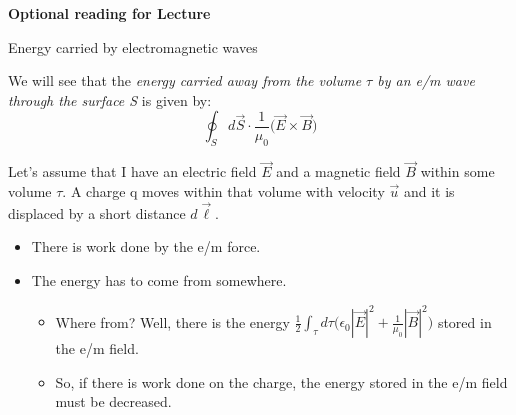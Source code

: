 
\begin{frame}[plain,c]
\begin{center}
{\Huge \bf Optional reading for Lecture \thislecture}
\end{center}
\end{frame}

%
%
%
%

\begin{frame}{Energy carried by electromagnetic waves}

We will see that the  {\em energy carried away from the volume $\tau$ by an e/m wave
through the surface S} is given by:
\begin{equation*}
     \oint_{S} d\vec{S} \cdot \frac{1}{\mu_0} \Big( \vec{E} \times \vec{B} \Big)
\end{equation*}

\vspace{0.3cm}

Let's assume that I have an electric field $\vec{E}$ and a magnetic field $\vec{B}$ within some volume $\tau$.
A charge q moves within that volume with velocity $\vec{u}$ and it is displaced by a short distance $d\vec{\ell}$.
\begin{itemize}
   \item There is work done by the e/m force.
   \item The energy has to come from somewhere.
       \begin{itemize}
            \item Where from? Well, there is the energy
                      $\displaystyle \frac{1}{2} \int_{\tau} d\tau \Big( \epsilon_0 |\vec{E}|^2 + \frac{1}{\mu_0} |\vec{B}|^2 \Big)$
                      stored in the e/m field.
             \item So, if there is work done on the charge, the energy stored in the e/m field must be decreased.
       \end{itemize}
\end{itemize}

\end{frame}

%
%
%
%

